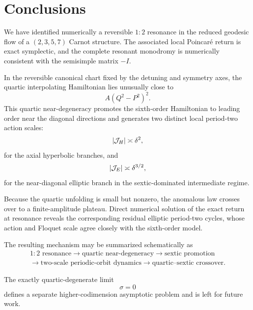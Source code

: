 \section{Conclusions}
\label{sec:conclusions}

We have identified numerically a reversible \(1{:}2\) resonance in the reduced geodesic flow of a \((2,3,5,7)\) Carnot structure. The associated local Poincaré return is exact symplectic, and the complete resonant monodromy is numerically consistent with the semisimple matrix \(-I\).

In the reversible canonical chart fixed by the detuning and symmetry axes, the quartic interpolating Hamiltonian lies unusually close to
\[
A(Q^2-P^2)^2.
\]
This quartic near-degeneracy promotes the sixth-order Hamiltonian to leading order near the diagonal directions and generates two distinct local period-two action scales:
\[
|\mathcal{J}_H|\asymp\delta^2,
\]
for the axial hyperbolic branches, and
\[
|\mathcal{J}_E|\asymp\delta^{3/2},
\]
for the near-diagonal elliptic branch in the sextic-dominated intermediate regime.

Because the quartic unfolding is small but nonzero, the anomalous law crosses over to a finite-amplitude plateau. Direct numerical solution of the exact return at resonance reveals the corresponding residual elliptic period-two cycles, whose action and Floquet scale agree closely with the sixth-order model.

The resulting mechanism may be summarized schematically as
\[
\begin{gathered}
\text{\(1{:}2\) resonance}
\longrightarrow
\text{quartic near-degeneracy}
\longrightarrow
\text{sextic promotion}
\\[2mm]
\longrightarrow
\text{two-scale periodic-orbit dynamics}
\longrightarrow
\text{quartic--sextic crossover}.
\end{gathered}
\]

The exactly quartic-degenerate limit
\[
\sigma=0
\]
defines a separate higher-codimension asymptotic problem and is left for future work.
